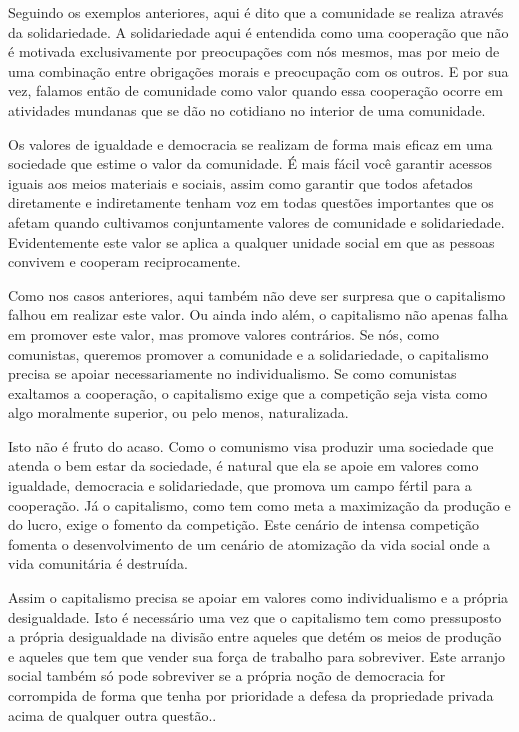 Seguindo os exemplos anteriores, aqui é dito que a comunidade se realiza através da solidariedade. A solidariedade aqui é entendida como uma cooperação que não é motivada exclusivamente por preocupações com nós mesmos,  mas por meio de uma combinação entre obrigações morais e preocupação com os outros. E por sua vez, falamos então de comunidade como valor quando essa cooperação ocorre em atividades mundanas que se dão no cotidiano no interior de uma comunidade.

Os valores de igualdade e democracia se realizam de forma mais eficaz em uma sociedade que estime o valor da comunidade. É mais fácil você garantir acessos iguais aos meios materiais e sociais, assim como garantir que todos afetados diretamente e indiretamente tenham voz em todas questões importantes que os afetam quando cultivamos conjuntamente valores de comunidade e solidariedade. Evidentemente este valor se aplica a qualquer unidade social em que as pessoas convivem e cooperam reciprocamente. 

Como nos casos anteriores, aqui também não deve ser surpresa que o capitalismo falhou em realizar este valor. Ou ainda indo além, o capitalismo não apenas falha em promover este valor, mas promove valores contrários. Se nós, como comunistas, queremos promover a comunidade e a solidariedade, o capitalismo precisa se apoiar necessariamente no individualismo. Se como comunistas exaltamos a cooperação, o capitalismo exige que a competição seja vista como algo moralmente superior, ou pelo menos, naturalizada.

Isto não é fruto do acaso. Como o comunismo visa produzir uma sociedade que atenda o bem estar da sociedade, é natural que ela se apoie em valores como igualdade, democracia e solidariedade, que promova um campo fértil para a cooperação. Já o capitalismo, como tem como meta a maximização da produção e do lucro, exige o fomento da competição. Este cenário de intensa competição fomenta o desenvolvimento de um cenário de atomização da vida social onde a vida comunitária é destruída.

Assim o capitalismo precisa se apoiar em valores como individualismo e a própria desigualdade. Isto é necessário uma vez que o capitalismo tem como pressuposto a própria desigualdade na divisão entre aqueles que detém os meios de produção e aqueles que tem que vender sua força de trabalho para sobreviver. Este arranjo social também só pode sobreviver se a própria noção de democracia for corrompida de forma que tenha por prioridade a defesa da propriedade privada acima de qualquer outra questão..

